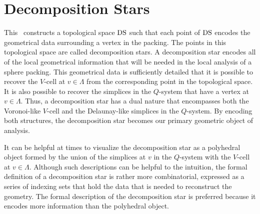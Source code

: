 







\chapter{Decomposition Stars} \label{sec:compact}

This \chap\ constructs a topological space ${\operatorname{DS}}$ such that
each point of ${\operatorname{DS}}$ encodes the geometrical data surrounding a
vertex in the packing. The points in this topological space are
called decomposition stars.  A decomposition star encodes all of
the local geometrical information that will be needed in the local
analysis of a sphere packing.  This geometrical data is
sufficiently detailed that it is possible to recover the $V$-cell
at $v\in\Lambda$ from the corresponding point in the topological
space.  It is also possible to recover the simplices in the
$Q$-system that have a vertex at $v\in\Lambda$. Thus, a
decomposition star has a dual nature that encompasses both the
Voronoi-like $V$-cell and the Delaunay-like simplices in the
$Q$-system.  By encoding both structures, the decomposition star
becomes our primary geometric object of analysis.

It can be helpful at times to visualize the decomposition star as
a polyhedral object formed by the union of the simplices at $v$ in
the $Q$-system with the $V$-cell at $v\in\Lambda$.
Although
such descriptions can be helpful to the intuition, the formal
definition of a decomposition star is rather more combinatorial,
expressed as a series of indexing sets that hold the data that is
needed to reconstruct the geometry. The formal description of the
decomposition star is preferred because it encodes more
information than the polyhedral object.

